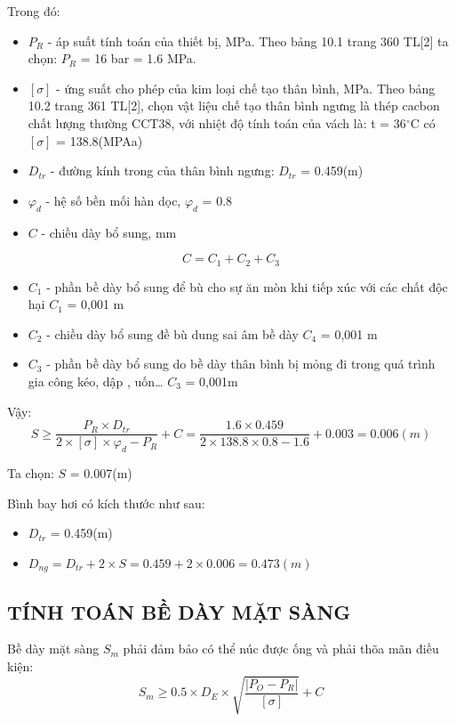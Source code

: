 Trong đó:
\begin{itemize}
	\item $P_{R}$ - áp suất tính toán của thiết bị, MPa. Theo bảng 10.1 trang 360 TL[2] ta chọn: $P_{R}$ = 16 bar = 1.6 MPa.
	\item $[\sigma]$ - ứng suất cho phép của kim loại chế tạo thân bình, MPa. Theo bảng 10.2 trang 361 TL[2], chọn vật liệu chế tạo thân bình ngưng là thép cacbon chất lượng thường CCT38, với nhiệt độ tính toán của vách là: t = 36$^{\circ}$C có $[\sigma]$ = 138.8(MPAa)
	\item $D_{tr}$ - đường kính trong của thân bình ngưng: $D_{tr}$ = 0.459(m)
	\item $\varphi_{d}$ - hệ số bền mối hàn dọc, $\varphi_{d}$ = 0.8
	\item $C$ - chiều dày bổ sung, mm
\end{itemize}
\begin{equation*}
	C = C_{1} + C_{2} + C_{3}
\end{equation*}
\begin{itemize}[label={$\star$}]
	\item $C_{1}$ - phần bề dày bổ sung để bù cho sự ăn mòn khi tiếp xúc với các	chất độc hại $C_{1}$ = 0,001 m
	\item $C_{2}$ - chiều dày bổ sung đề bù dung sai âm bề dày $C_{4}$ = 0,001 m
	\item $C_{3}$ - phần bề dày bổ sung do bề dày thân bình bị mỏng đi trong quá trình gia công kéo, dập , uốn… $C_{3}$ = 0,001m
\end{itemize}

Vậy:
\begin{equation*}
	S \geq \dfrac{P_{R}\times D_{tr}}{2\times [\sigma]\times\varphi_{d} - P_{R}} + C = \dfrac{1.6 \times 0.459}{2 \times 138.8 \times 0.8 - 1.6}+0.003 = 0.006(m)
\end{equation*}

Ta chọn: $S$ = 0.007(m)

Bình bay hơi có kích thước như sau:
\begin{itemize}[label={$\diamond$}]
	\item $D_{tr}$ = 0.459(m)
	\item $D_{ng} = D_{tr} + 2\times S = 0.459 + 2 \times 0.006 = 0.473(m) $
\end{itemize}

\subsection{TÍNH TOÁN BỀ DÀY MẶT SÀNG}
Bề dày mặt sàng $S_{m}$ phải đảm bảo có thể núc được ống và phải thõa mãn điều kiện:
\begin{equation*}
	S_{m} \geq 0.5\times D_{E}\times \sqrt{\dfrac{|P_{O} - P_{R}|}{[\sigma]}} + C
\end{equation*}

